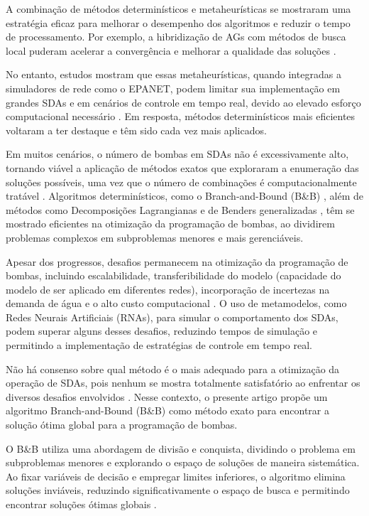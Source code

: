 A combinação de métodos determinísticos e metaheurísticas se mostraram uma estratégia eficaz para melhorar o desempenho dos algoritmos e reduzir o tempo de processamento. Por exemplo, a hibridização de AGs com métodos de busca local puderam acelerar a convergência e melhorar a qualidade das soluções \cite{reis2006water, vanZyl2004}.

No entanto, estudos mostram que essas metaheurísticas, quando integradas a simuladores de rede como o EPANET, podem limitar sua implementação em grandes SDAs e em cenários de controle em tempo real, devido ao elevado esforço computacional necessário \cite{MalaJetmarova2017}. Em resposta, métodos determinísticos mais eficientes voltaram a ter destaque e têm sido cada vez mais aplicados.

Em muitos cenários, o número de bombas em SDAs não é excessivamente alto, tornando viável a aplicação de métodos exatos que exploraram a enumeração das soluções possíveis, uma vez que o número de combinações é computacionalmente tratável \cite{Costa2015}. Algoritmos determinísticos, como o Branch-and-Bound (B\&B) \cite{land2010automatic, costa2001global}, além de métodos como Decomposições Lagrangianas \cite{Ghaddar2015} e de Benders generalizadas \cite{verleye2016generalized}, têm se mostrado eficientes na otimização da programação de bombas, ao dividirem problemas complexos em subproblemas menores e mais gerenciáveis.

Apesar dos progressos, desafios permanecem na otimização da programação de bombas, incluindo escalabilidade, transferibilidade do modelo (capacidade do modelo de ser aplicado em diferentes redes), incorporação de incertezas na demanda de água e o alto custo computacional \cite{Kerimov2023}. O uso de metamodelos, como Redes Neurais Artificiais (RNAs)\cite{behzadian2009stochastic, broad2005water, rao2007use}, para simular o comportamento dos SDAs, podem superar alguns desses desafios, reduzindo tempos de simulação e permitindo a implementação de estratégias de controle em tempo real.

Não há consenso sobre qual método é o mais adequado para a otimização da operação de SDAs, pois nenhum se mostra totalmente satisfatório ao enfrentar os diversos desafios envolvidos \cite{MalaJetmarova2017}. Nesse contexto, o presente artigo propõe um algoritmo Branch-and-Bound (B\&B) como método exato para encontrar a solução ótima global para a programação de bombas. 

O B\&B utiliza uma abordagem de divisão e conquista, dividindo o problema em subproblemas menores e explorando o espaço de soluções de maneira sistemática. Ao fixar variáveis de decisão e empregar limites inferiores, o algoritmo elimina soluções inviáveis, reduzindo significativamente o espaço de busca e permitindo encontrar soluções ótimas globais \cite{Costa2015}.

